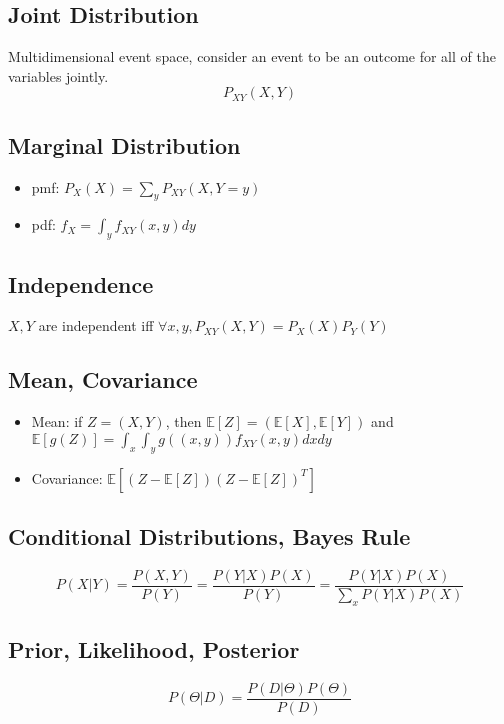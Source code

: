 \documentclass[letterpaper,10pt]{article}
\begin{document}
\subsection{Joint Distribution}

Multidimensional event space, consider an event to be an outcome for all of the variables jointly.
$$P_{XY}(X,Y)$$

\subsection{Marginal Distribution}

\begin{itemize}
	\item pmf: $P_X(X)=\sum_y{P_{XY}(X,Y=y)}$
	\item pdf: $f_X=\int_y{f_{XY}(x,y)dy}$
\end{itemize}

\subsection{Independence}

$X,Y$ are independent iff $\forall x,y, P_{XY}(X,Y)=P_X(X)P_Y(Y)$

\subsection{Mean, Covariance}

\begin{itemize}
	\item Mean: if $Z=(X,Y)$, then $\mathbb{E}[Z]=(\mathbb{E}[X],\mathbb{E}[Y])$ and $\mathbb{E}[g(Z)]=\int_x\int_y g((x,y))f_{XY}(x,y)dxdy$
	\item Covariance: $\mathbb{E}[(Z-\mathbb{E}[Z])(Z-\mathbb{E}[Z])^T]$
\end{itemize}

\subsection{Conditional Distributions, Bayes Rule}

$$P(X|Y)=\frac{P(X,Y)}{P(Y)}=\frac{P(Y|X)P(X)}{P(Y)}=\frac{P(Y|X)P(X)}{\sum_x P(Y|X)P(X)}$$

\subsection{Prior, Likelihood, Posterior}

$$P(\Theta|D)=\frac{P(D|\Theta)P(\Theta)}{P(D)}$$
\end{document}
